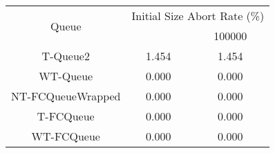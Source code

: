 \begin{tabular}{|c|c|c|}
\hline
\multirow{2}{*}{Queue} & \multicolumn{2}{c|}{Initial Size Abort Rate (\%)}\\\cline{2-3}& \qquad 10000 \qquad\quad & 100000\\
\hline
\hline
T-Queue2 & 1.454 & 1.454\\
WT-Queue & 0.000 & 0.000\\
NT-FCQueueWrapped & 0.000 & 0.000\\
T-FCQueue & 0.000 & 0.000\\
WT-FCQueue & 0.000 & 0.000\\
\hline\end{tabular}
